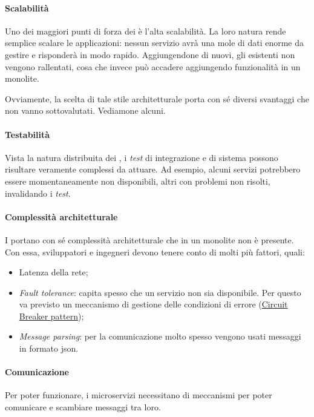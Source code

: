\paragraph*{Scalabilità} Uno dei maggiori punti di forza dei  è l'alta scalabilità. La loro natura rende semplice scalare le
applicazioni: nessun servizio avrà una mole di dati enorme da gestire e risponderà in modo rapido. Aggiungendone di nuovi, gli esistenti non vengono rallentati, cosa che invece può accadere aggiungendo funzionalità in un monolite.

\bigskip

Ovviamente, la scelta di tale stile architetturale porta con sé diversi svantaggi che non vanno sottovalutati. Vediamone alcuni.

\paragraph*{Testabilità} Vista la natura distribuita dei , i \textit{test} di integrazione e di sistema possono risultare veramente complessi
da attuare. Ad esempio, alcuni servizi potrebbero essere momentaneamente non disponibili, altri con problemi non risolti, invalidando i \textit{test}.

\paragraph*{Complessità architetturale} I  portano con sé complessità architetturale che in un monolite non è presente.
Con essa, sviluppatori e ingegneri devono tenere conto di molti più fattori, quali:
\begin{itemize}
	\item Latenza della rete;
	\item \textit{Fault tolerance}: capita spesso che un servizio non sia disponibile. Per questo va previsto un meccanismo di gestione delle
	condizioni di errore (\hyperref[circuit-breaker]{Circuit Breaker pattern});
	\item \textit{Message parsing}: per la comunicazione molto spesso vengono usati messaggi in formato \acrshort{json}.
\end{itemize}

\paragraph*{Comunicazione} Per poter funzionare, i microservizi necessitano di meccanismi per poter comunicare e scambiare messaggi tra loro.

